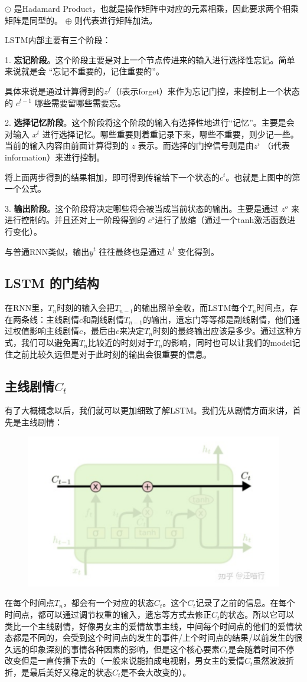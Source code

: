 \documentclass[12pt]{article}
\begin{document}
$\odot$ 是Hadamard Product，也就是操作矩阵中对应的元素相乘，因此要求两个相乘矩阵是同型的。 $\oplus$ 则代表进行矩阵加法。

LSTM内部主要有三个阶段：

1. \textbf{忘记阶段}。这个阶段主要是对上一个节点传进来的输入进行选择性忘记。简单来说就是会 “忘记不重要的，记住重要的”。

具体来说是通过计算得到的$z^f$（f表示forget）来作为忘记门控，来控制上一个状态的 $c^{t-1}$ 哪些需要留哪些需要忘。

2. \textbf{选择记忆阶段}。这个阶段将这个阶段的输入有选择性地进行“记忆”。主要是会对输入 $x^t$ 进行选择记忆。哪些重要则着重记录下来，哪些不重要，则少记一些。当前的输入内容由前面计算得到的 $z$ 表示。而选择的门控信号则是由$z^i$ （i代表information）来进行控制。

将上面两步得到的结果相加，即可得到传输给下一个状态的$c^t$。也就是上图中的第一个公式。

3. \textbf{输出阶段}。这个阶段将决定哪些将会被当成当前状态的输出。主要是通过 $z^o$ 来进行控制的。并且还对上一阶段得到的 $c^o$进行了放缩（通过一个tanh激活函数进行变化）。

与普通RNN类似，输出$y^t$ 往往最终也是通过 $h^t$ 变化得到。

\subsection{LSTM 的门结构\cite{LSTM_Principle_And_Practice}}
在RNN里，$T_n$时刻的输入会把$T_{n-1}$的输出照单全收，而LSTM每个$T_n$时间点，存在两条线：主线剧情$c$和副线剧情$T_{n-1}$的输出，遗忘门等等都是副线剧情，他们通过权值影响主线剧情$c$，最后由$c$来决定$T_n$时刻的最终输出应该是多少。通过这种方式，我们可以避免离$T_n$比较近的时刻对于$T_n$的影响，同时也可以让我们的model记住之前比较久远但是对于此时刻的输出会很重要的信息。

\subsection{主线剧情$C_t$}
有了大概概念以后，我们就可以更加细致了解LSTM。我们先从剧情方面来讲，首先是主线剧情：
\begin{figure}[H]
    \centering
    \includegraphics[width=.6\textwidth]{fig/LSTM_Main_Stream.png}
\end{figure}
在每个时间点$T_n$，都会有一个对应的状态$C_t$。这个$C_t$记录了之前的信息。在每个时间点，都可以通过调节权重的输入，遗忘等方式去修正$C_t$的状态。所以它可以类比一个主线剧情，好像男女主的爱情故事主线，中间每个时间点的他们的爱情状态都是不同的，会受到这个时间点的发生的事件/上个时间点的结果/以前发生的很久远的印象深刻的事情各种因素的影响，但是这个核心要素$C_t$是会随着时间不停改变但是一直传播下去的（一般来说能拍成电视剧，男女主的爱情$C_t$虽然波波折折，是最后美好又稳定的状态$C_t$是不会大改变的）。
\end{document}

